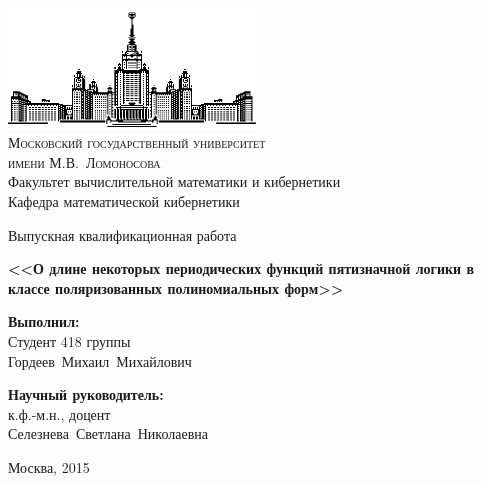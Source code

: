 \documentclass[12pt, a4paper]{article}
\begin{document}
\thispagestyle{empty}

\begin{center}
\ \vspace{-4cm}

\includegraphics[width=0.5\textwidth]{msu.eps}\\
{\scshape Московский государственный университет \\ имени М.В.~Ломоносова}\\
Факультет вычислительной математики и кибернетики\\
Кафедра математической кибернетики

\vspace{5cm}

{\LARGE Выпускная квалификационная работа}

\vspace{1cm}

{\Huge\bfseries
<<О длине некоторых периодических функций пятизначной логики в классе поляризованных
    полиномиальных форм>>\\}
\end{center}

\vfill

\begin{flushright}
  \large
  \textbf{Выполнил:}\\
  Студент 418 группы\\
  Гордеев~Михаил~Михайлович

  \vspace{5mm}

  \textbf{Научный руководитель:}\\
  к.ф.-м.н., доцент\\
  Селезнева~Светлана~Николаевна
\end{flushright}

\vfill

\begin{center}
Москва, 2015
\end{center}

\enlargethispage{4\baselineskip}

\newpage
\end{document}
